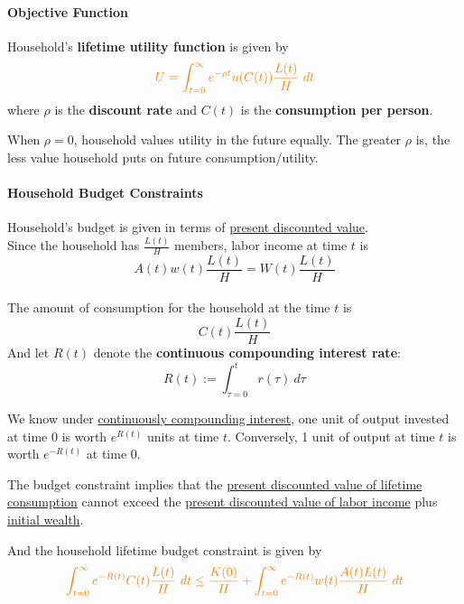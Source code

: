 \documentclass[]{article}
\begin{document}
	\paragraph{Objective Function} Household's \textbf{lifetime utility function} is given by
	\begin{equation}
		\textcolor{orange}{
			U = \int_{t=0}^\infty {e^{-\rho t} u(C(t)) \frac{L(t)}{H}}\ dt
		}
	\end{equation}
	where $\rho$ is the \textbf{discount rate} and $C(t)$ is the \textbf{consumption per person}.
	\begin{remark}
		When $\rho = 0$, household values utility in the future equally. The greater $\rho$ is, the less value household puts on future consumption/utility.
	\end{remark}
	
	\paragraph{Household Budget Constraints} Household's budget is given in terms of \ul{present discounted value}. \\
	Since the household has $\frac{L(t)}{H}$ members, labor income at time $t$ is 
	\[
		A(t)w(t)\frac{L(t)}{H} = W(t)\frac{L(t)}{H}
	\]
	\\
	The amount of consumption for the household at the time $t$ is 
	\[
		C(t)\frac{L(t)}{H}
	\]
	And let $R(t)$ denote the \textbf{continuous compounding interest rate}:
	\begin{equation}
		R(t) := \int_{\tau=0}^t r(\tau)\ d\tau
	\end{equation}
	\begin{remark}
		We know under \ul{continuously compounding interest}, one unit of output invested at time 0 is worth $e^{R(t)}$ units at time $t$. Conversely, 1 unit of output at time $t$ is worth $e^{-R(t)}$ at time 0.
	\end{remark}
	\begin{remark}
		The budget constraint implies that the \ul{present discounted value of lifetime consumption} cannot exceed the \ul{present discounted value of labor income} plus \ul{initial wealth}.
	\end{remark}
	\par And the household lifetime budget constraint is given by
	\begin{equation}
		\textcolor{orange}{
			\int_{t=0}^\infty e^{-R(t)} C(t) \frac{L(t)}{H}\ dt \leq \frac{K(0)}{H} + \int_{t=0}^\infty e^{-R(t)} w(t) \frac{A(t)L(t)}{H}\ dt
		}
	\end{equation}
\end{document}
